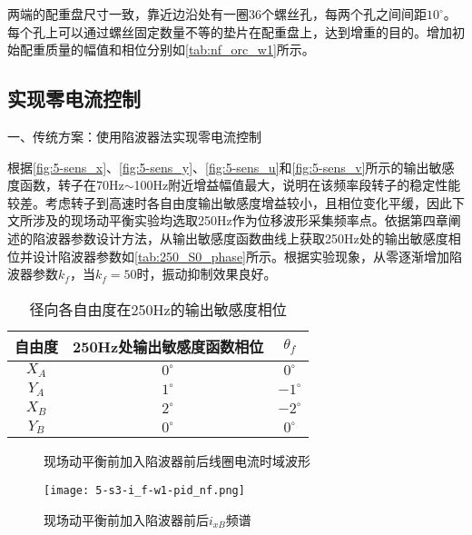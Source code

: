 两端的配重盘尺寸一致，靠近边沿处有一圈36个螺丝孔，每两个孔之间间距$10^{\circ}$。每个孔上可以通过螺丝固定数量不等的垫片在配重盘上，达到增重的目的。增加初始配重质量的幅值和相位分别如\autoref{tab:nf_orc_w1}所示。

\subsection{实现零电流控制}

一、传统方案：使用陷波器法实现零电流控制

根据\autoref{fig:5-sens_x}、\autoref{fig:5-sens_y}、\autoref{fig:5-sens_u}和\autoref{fig:5-sens_v}所示的输出敏感度函数，转子在70Hz$\sim$100Hz附近增益幅值最大，说明在该频率段转子的稳定性能较差。考虑转子到高速时各自由度输出敏感度增益较小，且相位变化平缓，因此下文所涉及的现场动平衡实验均选取250Hz作为位移波形采集频率点。依据第四章阐述的陷波器参数设计方法，从输出敏感度函数曲线上获取250Hz处的输出敏感度相位并设计陷波器参数如\autoref{tab:250_S0_phase}所示。根据实验现象，从零逐渐增加陷波器参数$k_f$，当$k_f = 50$时，振动抑制效果良好。

\begin{table}[htb]
  \caption[径向各自由度在250Hz的输出敏感度相位]{径向各自由度在250Hz的输出敏感度相位\label{tab:250_S0_phase}}
  \begin{tabular}{ccc}
    \toprule
    自由度 & 250Hz处输出敏感度函数相位 & $\theta _f$ \\
    \midrule
    $X_A$ & $0^{\circ}$ & $0^{\circ}$\\
    $Y_A$ & $1^{\circ}$ & $-1^{\circ}$\\
    $X_B$ & $2^{\circ}$ & $-2^{\circ}$\\
    $Y_B$ & $0^{\circ}$ & $0^{\circ}$\\
    \bottomrule
  \end{tabular}
\end{table}

\begin{figure}[htb]  
	\quad  
	\caption{现场动平衡前加入陷波器前后线圈电流时域波形}  \label{fig:5-s3-i-w1-pid_nf}\end{figure}

\begin{figure}
	\texttt{[image: 5-s3-i\_f-w1-pid\_nf.png]}
	\caption{现场动平衡前加入陷波器前后$i_{xB}$频谱}
	\label{fig:5-s3-i_f-w1-pid_nf}
\end{figure}

